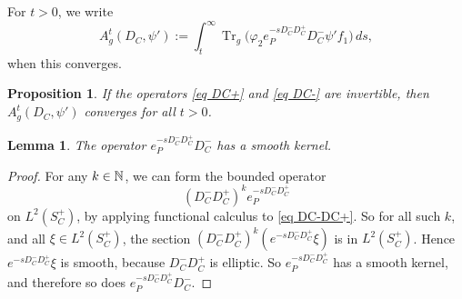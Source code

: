 \documentclass[11pt]{article}
\theoremstyle{plain}
\newtheorem{lemma}[theorem]{Lemma}
\newtheorem{proposition}[theorem]{Proposition}
\theoremstyle{definition}
\theoremstyle{remark}
\numberwithin{equation}{section}
\DeclareMathOperator{\Tr}{Tr}
\DeclareMathOperator{\dom}{dom}
\begin{document}
For $t>0$, we write
\[
A_{g}^t(D_C, \psi') := \int_t^{\infty} \Tr_g\bigl(\varphi_2 e_P^{-s D_C^- D_C^+} D_C^- \psi' f_1\bigr)\, ds,
\]
when this converges.
\begin{proposition}\label{prop conv cusp contr}
If the operators \eqref{eq DC+} and \eqref{eq DC-} are invertible, then $A_{g}^t(D_C, \psi')$
converges
 for all $t>0$.
\end{proposition}

\begin{lemma}\label{lem smooth At}
 The operator $e_P^{-sD_C^-D_C^+}D_C^-$ has a smooth kernel.
\end{lemma}
\begin{proof}
%
%
For any $k \in \mathbb{N}$, we can form the bounded operator
\[
(D_C^-D_C^+)^k
e_P^{-s D_C^- D_C^+}
\]
on $L^2(S_C^+)$,
by applying functional calculus to \eqref{eq DC-DC+}.
So for all such $k$, and all $\xi \in L^2(S_C^+)$, the section $(D_C^-D_C^+)^k(e^{-s D_C^- D_C^+} \xi)$ is in $L^2(S_C^+)$. Hence $e^{-s D_C^- D_C^+} \xi$ is smooth, because $D_C^-D_C^+$ is elliptic. So $e_P^{-s D_C^- D_C^+}$ has a smooth kernel, and therefore so does $e_P^{-sD_C^- D_C^+}D_C^-$.
%
\end{proof}

\end{document}
